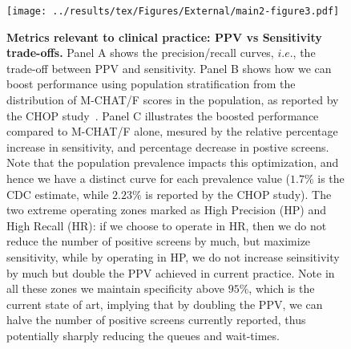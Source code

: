 \documentclass[onecolumn, compsoc,11pt]{IEEEtran}
\renewcommand{\captionN}[1]{\caption{\color{CadetBlue4!80!black} \sffamily \fontsize{9}{10}\selectfont #1  }}
\begin{document}
\begin{figure}[t]
  \tikzexternalenable
  \vspace{-10pt}

  \centering
  
  \def\AXISCOL{white}
  \def\TEXTCOL{gray}
   \texttt{[image: ../results/tex/Figures/External/main2-figure3.pdf]}

 \vspace{-10pt}

 \captionN{\textbf{Metrics relevant to clinical practice: PPV vs Sensitivity trade-offs.} Panel A shows the precision/recall curves, $i.e.$,  the trade-off between PPV and sensitivity. Panel B shows how we can boost performance using population stratification from the distribution of M-CHAT/F scores in the population, as reported by the CHOP study~\cite{pmid31562252}. Panel C illustrates the boosted performance compared to M-CHAT/F alone,
   mesured by the relative percentage increase in sensitivity, and percentage decrease in postive screens. Note that the population prevalence impacts this optimization, and hence  we have  a distinct  curve for each prevalence value ($1.7\%$ is the CDC estimate, while $2.23\%$ is reported by the CHOP study).  The two extreme operating zones marked as High Precision (HP) and High Recall (HR): if we choose to operate in HR, then we do not reduce the number of positive screens by much, but maximize sensitivity, while by operating in HP, we do not increase seinsitivity by much but double the PPV achieved in current practice. Note in all these zones we maintain specificity above $95\%$, which is the current state of art, implying that by doubling the PPV, we can halve the number of positive screens currently reported, thus potentially sharply reducing the queues and wait-times. }\label{figprc}
\end{figure}

\end{document}
